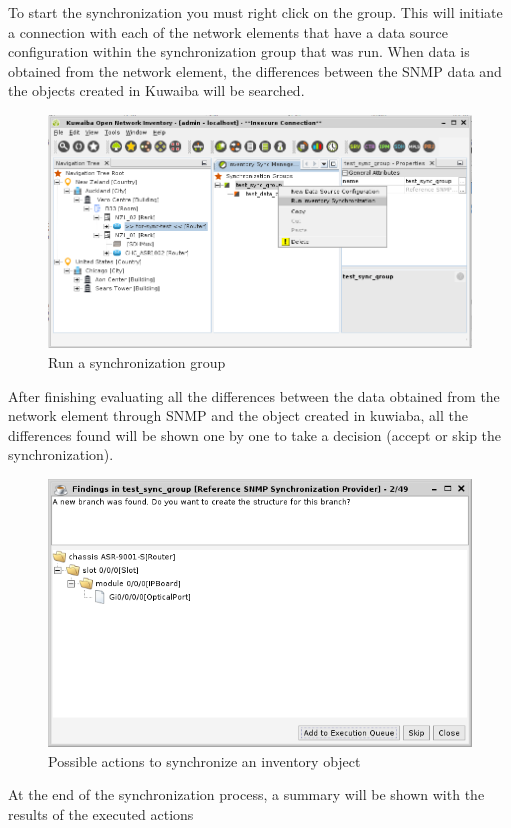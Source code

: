 \documentclass[a4paper]{article}
\begin{document}
			To start the synchronization you must right click on the group.  This will initiate a connection with each of the network elements that have a data source configuration within the synchronization group that was run.	When data is obtained from the network element, the differences between the SNMP data and the objects created in Kuwaiba will be searched.
			
			\begin{figure}[h!]
				\centering
				\includegraphics[width=0.6\linewidth]{img/sync_run_sync_group.png}
				\caption{Run a synchronization group}
				\label{fig:sync_run_sync_group.png}
			\end{figure}
			
			\clearpage
			
			After finishing evaluating all the differences between the data obtained from the network element through SNMP and the object created in kuwiaba, all the differences found will be shown one by one to take a decision (accept or skip the synchronization).\\
			
			\begin{figure}[h!]
				\centering
				\includegraphics[width=0.6\linewidth]{img/sync_possible_actions_2.png}
				\caption{Possible actions to synchronize an inventory object}
				\label{fig:sync_possible_actions_2}
			\end{figure}
		
			At the end of the synchronization process, a summary will be shown with the results of the executed actions\\
			
\end{document}
